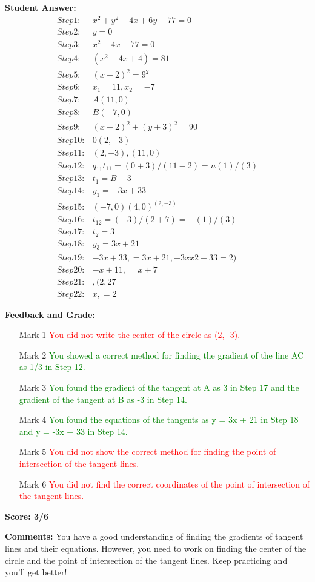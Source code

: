 \documentclass{article}
\begin{document}
\textbf{Student Answer:}
\begin{align*}
Step 1: & x^{2}+y^{2}-4x+6y-77=0 \\
Step 2: & y=0 \\
Step 3: & x^{2}-4x-77=0 \\
Step 4: & (x^{2}-4x+4)=81 \\
Step 5: & (x-2)^{2}=9^{2} \\
Step 6: & x_1=11, x_2=-7 \\
Step 7: & A(11, 0) \\
Step 8: & B(-7, 0) \\
Step 9: & (x-2)^{2}+(y+3)^{2}=90 \\
Step 10: & 0(2,-3) \\
Step 11: & (2,-3),(11,0) \\
Step 12: & q_{11}t_{11}=(0+3)/(11-2)=n(1)/(3) \\
Step 13: & t_1=B-3 \\
Step 14: & y_1=-3x+33 \\
Step 15: & (-7,0)(4,0)^{(2,-3)} \\
Step 16: & t_{12}= (-3)/(2+7)=-(1)/(3) \\
Step 17: & t_2=3 \\
Step 18: & y_3=3x+21 \\
Step 19: & -3x+33,=3x+21,-3xx2+33=2) \\
Step 20: & -x+11,=x+7 \\
Step 21: & ,(2, 27 \\
Step 22: & x,=2
\end{align*}

\textbf{Feedback and Grade:}
\begin{itemize}
\item[Mark 1] \textcolor{red}{You did not write the center of the circle as (2, -3).}
\item[Mark 2] \textcolor{green}{You showed a correct method for finding the gradient of the line AC as 1/3 in Step 12.}
\item[Mark 3] \textcolor{green}{You found the gradient of the tangent at A as 3 in Step 17 and the gradient of the tangent at B as -3 in Step 14.}
\item[Mark 4] \textcolor{green}{You found the equations of the tangents as y = 3x + 21 in Step 18 and y = -3x + 33 in Step 14.}
\item[Mark 5] \textcolor{red}{You did not show the correct method for finding the point of intersection of the tangent lines.}
\item[Mark 6] \textcolor{red}{You did not find the correct coordinates of the point of intersection of the tangent lines.}
\end{itemize}

\textbf{Score: 3/6}

\textbf{Comments:} You have a good understanding of finding the gradients of tangent lines and their equations. However, you need to work on finding the center of the circle and the point of intersection of the tangent lines. Keep practicing and you'll get better!
\end{document}
